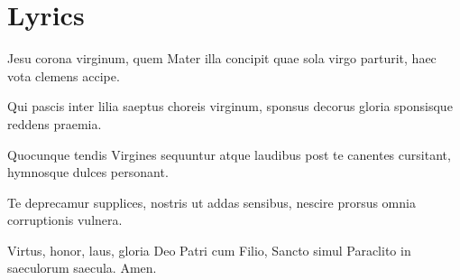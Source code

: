 \documentclass[tocstyle=none]{ees}
\begin{document}
\eesTitlePage


\section*{Lyrics}

Jesu corona virginum,
quem Mater illa concipit
quae sola virgo parturit,
haec vota clemens accipe.

Qui pascis inter lilia
saeptus choreis virginum,
sponsus decorus gloria
sponsisque reddens praemia.

Quocunque tendis Virgines
sequuntur atque laudibus
post te canentes cursitant,
hymnosque dulces personant.

Te deprecamur supplices,
nostris ut addas sensibus,
nescire prorsus omnia
corruptionis vulnera.

Virtus, honor, laus, gloria
Deo Patri cum Filio,
Sancto simul Paraclito
in saeculorum saecula.
Amen.

\eesToc{}

\eesScore
\end{document}
